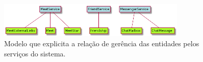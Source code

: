 \begin{figure}[H]
	\centering
	\includegraphics[width=0.8\textwidth]{figuras/entidade-servico-escrita.png}
	\caption{Modelo que explicita a relação de gerência das entidades pelos serviços do sistema.}
	\label{fig:ese}
\end{figure}

%
